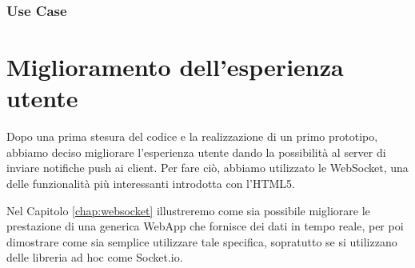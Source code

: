 \subsubsection{Use Case}

\section{Miglioramento dell'esperienza utente}
Dopo una prima stesura del codice e la realizzazione di un primo prototipo,
abbiamo deciso migliorare l'esperienza utente dando la possibilità al server di inviare notifiche push ai client.
Per fare ciò, abbiamo utilizzato le WebSocket, una delle funzionalità più interessanti introdotta con l'HTML5.

Nel Capitolo \ref{chap:websocket} illustreremo come sia possibile migliorare le  prestazione di una generica WebApp che fornisce dei dati in tempo reale, per poi dimostrare come sia semplice utilizzare tale specifica, sopratutto se si utilizzano delle libreria ad hoc come Socket.io. 